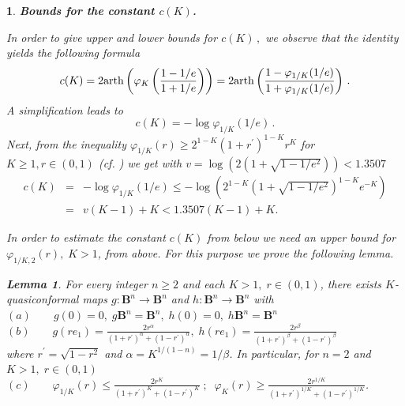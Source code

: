 \documentclass[12pt,a4paper,leqno]{amsart}
\theoremstyle{plain}
\newtheorem{lemma}[equation]{Lemma}
\newtheorem{subsec}[equation]{}
\numberwithin{equation}{section}          %
\begin{document}
\begin{subsec}{\bf Bounds for the constant $c(K)$.} {\rm
In order to give upper and lower bounds for $c(K)\,,$ we observe that the identity
\cite[Theorem 10.5(2)]{avvb} yields the following formula
$$c(K) = 2{\rm arth}\left( \varphi_K\left(\frac{1-1/e}{1+1/e}\right) \right)=
 2 {\rm arth} \left(\frac{1-\varphi_{1/K}(1/e)}{1+\varphi_{1/K}(1/e)} \right)\,.$$
A simplification leads to
 \begin{equation*} \label{mycK}
 c(K)=- \log \varphi_{1/K}(1/e)\,.
\end{equation*}
Next, from the inequality $ \varphi_{1/K}(r) \geq 2^{1-K}(1+r^{'})^{1-K}r^K $ for $K\ge 1, r\in (0,1)$
(cf. \cite[Corollary 8.74(2)]{avvb}) we get with $v=\log(2(1+\sqrt{1-1/e^2}))<1.3507$
\begin{eqnarray*}
 c(K)&=&- \log \varphi_{1/K}(1/e)\leq -\log \left(2^{1-K}(1+\sqrt{1-1/e^2})^{1-K}e^{-K}\right)\\
     &=& v(K-1)+K<1.3507(K-1)+K.
\end{eqnarray*}



In order to estimate the constant $c(K)$
from below we need an upper bound for $\varphi_{1/K,2}(r),\; K>1$, from above. For
this purpose we prove the following lemma.}

\begin{lemma}\label{ck} For every integer $n\geq 2$ and each $K>1,\;r\in(0,1)$, there exists
$K$-quasiconformal maps $g:\mathbf{B}^n\to \mathbf{B}^n$ and $h:\mathbf{B}^n\to\mathbf{B}^n$ with\\
$(a)\qquad g(0)=0,\;g\mathbf{B}^n=\mathbf{B}^n,\;h(0)=0,\; h\mathbf{B}^n=\mathbf{B}^n$\\
$(b)\qquad g(re_1)=\displaystyle\frac{2r^\alpha}{(1+r^{'})^\alpha+(1-r^{'})^\alpha},\;
h(re_1)=\displaystyle\frac{2r^\beta}{(1+r^{'})^\beta+(1-r^{'})^\beta}$\\
where $r^{'}=\sqrt{1-r^2}$ and $\alpha=K^{1/(1-n)}=1/\beta$.
In particular, for $n=2$ and $K>1,\; r\in(0,1)$\\
$(c)\qquad \varphi_{1/K}(r)\leq \displaystyle\frac{2r^K}{(1+r^{'})^K+(1-r^{'})^K}\;;\;\;
\varphi_{K}(r)\geq \displaystyle\frac{2r^{1/K}}{(1+r^{'})^{1/K}+(1-r^{'})^{1/K}}$.
\end{lemma}


\end{subsec}
\end{document}
